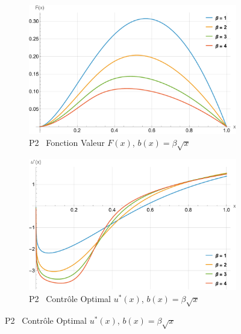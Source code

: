\begin{figure}[htb]
    \begin{subfigure}{0.45\linewidth}
        \includegraphics[width=\linewidth]{img/validation/P2/p2_B_value.pdf}
        \caption{P2 \textemdash~Fonction Valeur $F(x)$, $b(x)=\beta \sqrt{x}$}\label{fig:BetaValueVisualisation2}
    \end{subfigure}
    \hfill
    \begin{subfigure}{0.45\linewidth}
        \includegraphics[width=\linewidth]{img/validation/P2/p2_B_control.pdf}
        \caption{P2 \textemdash~Contrôle Optimal $u^*(x)$, $b(x)=\beta \sqrt{x}$}\label{fig:BetaControlVisualisation2}
    \end{subfigure}


\end{figure}
